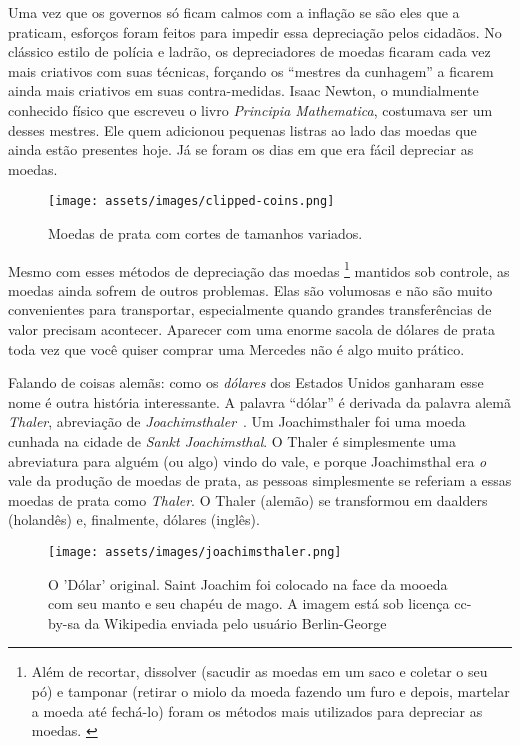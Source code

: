 Uma vez que os governos só ficam calmos com a inflação se são eles que a praticam, esforços foram feitos para impedir essa depreciação pelos cidadãos. No clássico estilo de polícia e ladrão, os depreciadores de moedas ficaram cada vez mais criativos com suas técnicas, forçando os \enquote{mestres da cunhagem} a ficarem ainda mais criativos em suas contra-medidas. Isaac Newton, o mundialmente conhecido físico que escreveu o livro \textit{Principia Mathematica}, costumava ser um desses mestres. Ele quem adicionou pequenas listras ao lado das moedas que ainda estão presentes hoje. Já se foram os dias em que era fácil depreciar as moedas.

\begin{figure}
  \texttt{[image: assets/images/clipped-coins.png]}
  \caption{Moedas de prata com cortes de tamanhos variados.}
  \label{fig:clipped-coins}
\end{figure}

Mesmo com esses métodos de depreciação das moedas \footnote{Além de recortar, dissolver (sacudir as moedas em um saco e coletar o seu pó) e tamponar (retirar o miolo da moeda fazendo um furo e depois, martelar a moeda até fechá-lo) foram os métodos mais utilizados para depreciar as moedas. \cite{wiki:coin-debasement}} mantidos sob controle, as moedas ainda sofrem de outros problemas. Elas são volumosas e não são muito convenientes para transportar, especialmente quando grandes transferências de valor precisam acontecer. Aparecer com uma enorme sacola de dólares de prata toda vez que você quiser comprar uma Mercedes não é algo muito prático.

Falando de coisas alemãs: como os \textit{dólares} dos Estados Unidos ganharam esse nome é outra história interessante. A palavra \enquote{dólar} é derivada da palavra alemã \textit{Thaler}, abreviação de \textit{Joachimsthaler}~\cite{wiki:thaler}. Um Joachimsthaler foi uma moeda cunhada na cidade de \textit{Sankt Joachimsthal}. O Thaler é simplesmente uma abreviatura para alguém (ou algo) vindo do vale, e porque Joachimsthal era \textit{o} vale da produção de moedas de prata, as pessoas simplesmente se referiam a essas moedas de prata como \textit{Thaler}. O Thaler (alemão) se transformou em daalders (holandês) e, finalmente, dólares (inglês).

\begin{figure}
  \centering
  \texttt{[image: assets/images/joachimsthaler.png]}
  \caption{O 'Dólar' original. Saint Joachim foi colocado na face da mooeda com seu manto e seu chapéu de mago. A imagem está sob licença cc-by-sa da Wikipedia enviada pelo usuário Berlin-George}
  \label{fig:joachimsthaler}
\end{figure}

